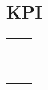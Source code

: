 \subsection{KPI}

\begin{table}
\centering
\begin{tabular}{ll}
 &   \\
 &   \\
 &   \\
 &   \\
 &   \\
 &   \\
 &   \\
 &   \\
 &  
\end{tabular}
\end{table}